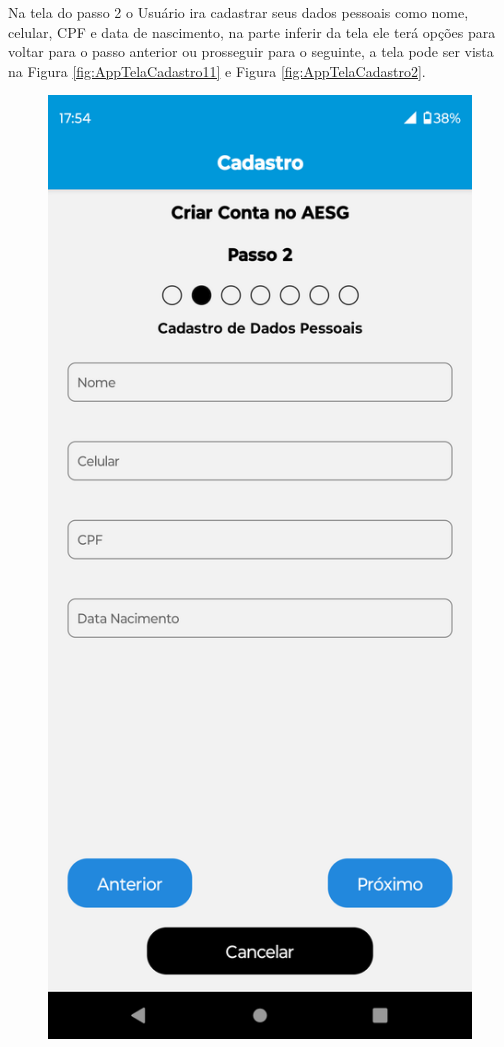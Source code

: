\documentclass[
    12pt,                   %
    openright,              %
    oneside,                %
    a4paper,                %
    sumario=tradicional,    %
    english,                %
    brazil,                 %
    ]{abntex2}
\begin{document}
            \newpage
            
            Na tela do passo 2 o Usuário ira cadastrar seus dados pessoais como nome, celular, CPF e data de nascimento, na parte inferir da tela ele terá opções para voltar para o passo anterior ou prosseguir para o seguinte, a tela pode ser vista na Figura \ref{fig:AppTelaCadastro11} e Figura \ref{fig:AppTelaCadastro2}.   
            \begin{figure}[!h]          
                \begin{minipage}{0.5\textwidth}
                    \centering
                    \includegraphics[width=0.8\linewidth]{Imagens/App Images User/AUCadastro11.png}

\end{minipage}
\end{figure}
\end{document}
